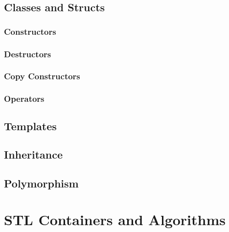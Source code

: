 \documentclass[11pt,fancy,authoryear]{elegantbook}
\begin{document}
\section{Classes and Structs}

\subsection{Constructors}

\subsection{Destructors}

\subsection{Copy Constructors}

\subsection{Operators}

\section{Templates}

\section{Inheritance}

\section{Polymorphism}

\chapter{STL Containers and Algorithms}
\end{document}
